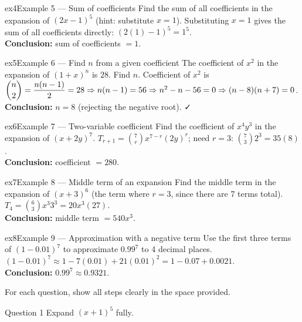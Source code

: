 \documentclass[11pt]{article}
\begin{document}
\begin{example}{ex4}{Example 5 --- Sum of coefficients}
Find the sum of all coefficients in the expansion of $(2x-1)^5$ (hint: substitute $x=1$).\soln
Substituting $x=1$ gives the sum of all coefficients directly: $(2(1)-1)^5=1^5$.\\[3pt]\textbf{Conclusion:} sum of coefficients $=1$.
\end{example}

\begin{example}{ex5}{Example 6 --- Find $n$ from a given coefficient}
The coefficient of $x^2$ in the expansion of $(1+x)^n$ is $28$. Find $n$.\soln
Coefficient of $x^2$ is $\dbinom n2=\dfrac{n(n-1)}2=28\Rightarrow n(n-1)=56\Rightarrow n^2-n-56=0\Rightarrow(n-8)(n+7)=0$.\\[3pt]\textbf{Conclusion:} $n=8$ (rejecting the negative root). ✓
\end{example}

\begin{example}{ex6}{Example 7 --- Two-variable coefficient}
Find the coefficient of $x^4y^3$ in the expansion of $(x+2y)^7$.\soln
$T_{r+1}=\binom7r x^{7-r}(2y)^r$; need $r=3$: $\binom73 2^3=35(8)$.\\[3pt]\textbf{Conclusion:} coefficient $=280$.
\end{example}

\begin{example}{ex7}{Example 8 --- Middle term of an expansion}
Find the middle term in the expansion of $(x+3)^6$ (the term where $r=3$, since there are 7 terms total).\soln
$T_4=\binom63 x^3 3^3=20x^3(27)$.\\[3pt]\textbf{Conclusion:} middle term $=540x^3$.
\end{example}

\begin{example}{ex8}{Example 9 --- Approximation with a negative term}
Use the first three terms of $(1-0.01)^7$ to approximate $0.99^7$ to 4 decimal places.\soln
$(1-0.01)^7\approx1-7(0.01)+21(0.01)^2=1-0.07+0.0021$.\\[3pt]\textbf{Conclusion:} $0.99^7\approx0.9321$.
\end{example}

\clearpage
{}
For each question, show all steps clearly in the space provided.

\begin{qbox}{Question 1}
Expand $(x+1)^5$ fully.\workspace{2.4cm}
\end{qbox}
\end{document}
